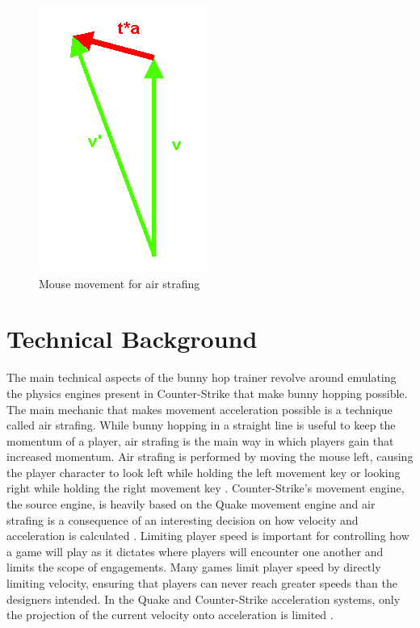 \documentclass[10pt,twocolumn]{article}
\begin{document}
\begin{figure}
    \centering
    \includegraphics[width=0.5\linewidth]{figure2.png}
    \caption{Mouse movement for air strafing \cite{MoreSteamAirstrafe}}
\end{figure}

\section{Technical Background}


The main technical aspects of the bunny hop trainer revolve around emulating the physics engines present in Counter-Strike that make bunny hopping possible. The main mechanic that makes movement acceleration possible is a technique called air strafing. While bunny hopping in a straight line is useful to keep the momentum of a player, air strafing is the main way in which players gain that increased momentum. Air strafing is performed by moving the mouse left, causing the player character to look left while holding the left movement key or looking right while holding the right movement key \cite{AirStrafingExplained}. Counter-Strike's movement engine, the source engine, is heavily based on the Quake movement engine and air strafing is a consequence of an interesting decision on how velocity and acceleration is calculated \cite{AirStrafingExplained}. Limiting player speed is important for controlling how a game will play as it dictates where players will encounter one another and limits the scope of engagements. Many games limit player speed by directly limiting velocity, ensuring that players can never reach greater speeds than the designers intended. In the Quake and Counter-Strike acceleration systems, only the projection of the current velocity onto acceleration is limited \cite{BunnyHoppingProgrammers}.
\end{document}
